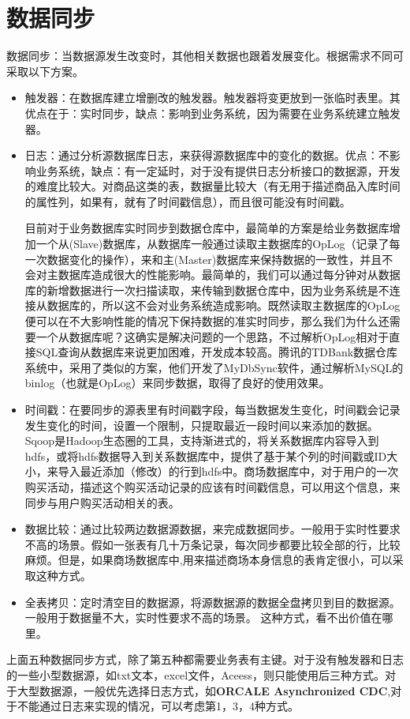 \section{数据同步}
数据同步：当数据源发生改变时，其他相关数据也跟着发展变化。根据需求不同可采取以下方案。
\begin{itemize}
\item 触发器：在数据库建立增删改的触发器。触发器将变更放到一张临时表里。其优点在于：实时同步，缺点：影响到业务系统，因为需要在业务系统建立触发器。
\item 日志：通过分析源数据库日志，来获得源数据库中的变化的数据。优点：不影响业务系统，缺点：有一定延时，对于没有提供日志分析接口的数据源，开发的难度比较大。对商品这类的表，数据量比较大（有无用于描述商品入库时间的属性列，如果有，就有了时间戳信息），而且很可能没有时间戳。
\par \qquad 目前对于业务数据库实时同步到数据仓库中，最简单的方案是给业务数据库增加一个从(Slave)数据库，从数据库一般通过读取主数据库的OpLog（记录了每一次数据变化的操作），来和主(Master)数据库来保持数据的一致性，并且不会对主数据库造成很大的性能影响。最简单的，我们可以通过每分钟对从数据库的新增数据进行一次扫描读取，来传输到数据仓库中，因为业务系统是不连接从数据库的，所以这不会对业务系统造成影响。既然读取主数据库的OpLog便可以在不大影响性能的情况下保持数据的准实时同步，那么我们为什么还需要一个从数据库呢？这确实是解决问题的一个思路，不过解析OpLog相对于直接SQL查询从数据库来说更加困难，开发成本较高。腾讯的TDBank数据仓库系统中，采用了类似的方案，他们开发了MyDbSync软件，通过解析MySQL的binlog（也就是OpLog）来同步数据，取得了良好的使用效果。 
\item 时间戳：在要同步的源表里有时间戳字段，每当数据发生变化，时间戳会记录发生变化的时间，设置一个限制，只提取最近一段时间以来添加的数据。Sqoop是Hadoop生态圈的工具，支持渐进式的，将关系数据库内容导入到hdfs，或将hdfs数据导入到关系数据库中，提供了基于某个列的时间戳或ID大小，来导入最近添加（修改）的行到hdfs中。商场数据库中，对于用户的一次购买活动，描述这个购买活动记录的应该有时间戳信息，可以用这个信息，来同步与用户购买活动相关的表。
\item 数据比较：通过比较两边数据源数据，来完成数据同步。一般用于实时性要求不高的场景。假如一张表有几十万条记录，每次同步都要比较全部的行，比较麻烦。但是，如果商场数据库中,用来描述商场本身信息的表肯定很小，可以采取这种方式。
\item 全表拷贝：定时清空目的数据源，将源数据源的数据全盘拷贝到目的数据源。一般用于数据量不大，实时性要求不高的场景。
这种方式，看不出价值在哪里。
\end{itemize}
\par 上面五种数据同步方式，除了第五种都需要业务表有主键。对于没有触发器和日志的一些小型数据源，如txt文本，excel文件，Aceess，则只能使用后三种方式。对于大型数据源，一般优先选择日志方式，如\textbf{ORCALE Asynchronized CDC},对于不能通过日志来实现的情况，可以考虑第1，3，4种方式。
